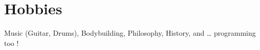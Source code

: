\section{Hobbies}
 \resumeSubHeadingListStart
 \renewcommand{\labelitemi}{-}
 \setlength{\itemindent}{-15pt}
 \item{Music (Guitar, Drums), Bodybuilding, Philosophy, History, and … programming too !}
 \resumeSubHeadingListEnd